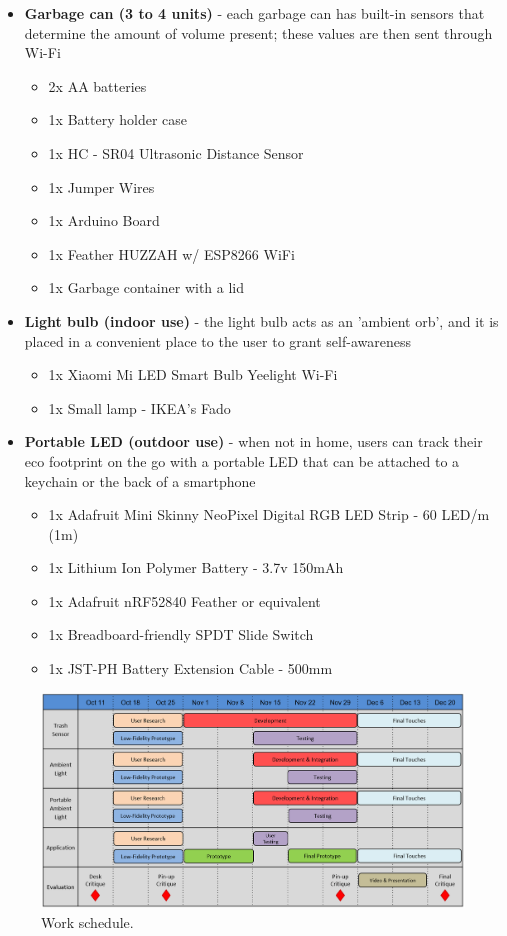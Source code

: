 \documentclass{sigchi-ext}
\begin{document}
\begin{itemize}
	\item \textbf{Garbage can (3 to 4 units)} - each garbage can has built-in sensors that determine the amount of volume present; these values are then sent through Wi-Fi
	\begin{itemize}
		\item 2x AA batteries
		\item 1x Battery holder case
		\item 1x HC - SR04 Ultrasonic Distance Sensor
		\item 1x Jumper Wires
		\item 1x Arduino Board
		\item 1x Feather HUZZAH w/ ESP8266 WiFi
		\item 1x Garbage container with a lid
	\end{itemize}
	\item \textbf{Light bulb (indoor use)} - the light bulb acts as an 'ambient orb', and it is placed in a convenient place to the user to grant self-awareness
	\begin{itemize}
		\item 1x Xiaomi Mi LED Smart Bulb Yeelight Wi-Fi
		\item 1x Small lamp - IKEA's Fado
	\end{itemize}
	\item \textbf{Portable LED (outdoor use)} - when not in home, users can track their eco footprint on the go with a portable LED that can be attached to a keychain or the back of a smartphone
	\begin{itemize}
		\item 1x Adafruit Mini Skinny NeoPixel Digital RGB LED Strip - 60 LED/m (1m)
		\item 1x Lithium Ion Polymer Battery - 3.7v 150mAh
		\item 1x Adafruit nRF52840 Feather or equivalent
		\item 1x Breadboard-friendly SPDT Slide Switch
		\item 1x JST-PH Battery Extension Cable - 500mm
	\end{itemize}
\end{itemize}

\begin{figure}
  \centering
  \includegraphics[width=.9\textwidth]{figures/schedule}
  \caption{Work schedule.}
\end{figure}



\end{document}
